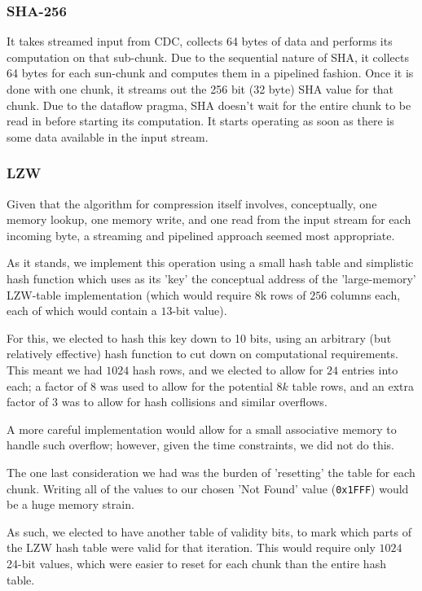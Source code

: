 \documentclass{article}
\begin{document}
\subsubsection{SHA-256}
It takes streamed input from CDC, collects 64 bytes of data and performs its computation on that sub-chunk. Due to the sequential nature of SHA, it collects 64 bytes for each sun-chunk and computes them in a pipelined fashion. Once it is done with one chunk, it streams out the 256 bit (32 byte) SHA value for that chunk. Due to the dataflow pragma, SHA doesn't wait for the entire chunk to be read in before starting its computation. It starts operating as soon as there is some data available in the input stream.

\subsubsection{LZW}

Given that the algorithm for compression itself involves, conceptually, one memory lookup, one memory write, and one read from the input stream for each incoming byte,
a streaming and pipelined approach seemed most appropriate.
\par
As it stands, we implement this operation using a small hash table and simplistic hash function which uses as its 'key'
the conceptual address of the 'large-memory' LZW-table implementation (which would require 8k rows of $256$ columns each, each of which would contain a $13$-bit value).
\par
For this, we elected to hash this key down to 10 bits, using an arbitrary (but relatively effective) hash function to cut down on computational requirements.
This meant we had $1024$ hash rows, and we elected to allow for $24$ entries into each; a factor of $8$ was used to allow for the potential $8k$ table rows, and an extra factor of $3$ was to allow for hash collisions and similar overflows.
\par
A more careful implementation would allow for a small associative memory to handle such overflow; however, given the time constraints, we did not do this.
\newline\par
The one last consideration we had was the burden of 'resetting' the table for each chunk.
Writing all of the values to our chosen 'Not Found' value (\texttt{0x1FFF}) would be a huge memory strain.
\par
As such, we elected to have another table of validity bits, to mark which parts of the LZW hash table were valid for that iteration.
This would require only $1024$ 24-bit values, which were easier to reset for each chunk than the entire hash table.
\end{document}

